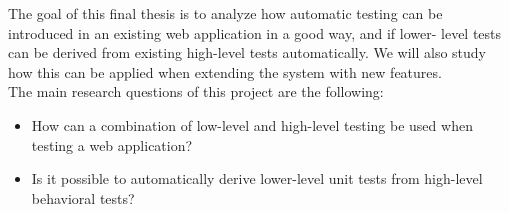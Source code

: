 
The goal of this final thesis is to analyze how automatic testing can be
introduced in an existing web application in a good way, and if lower-
level tests can be derived from existing high-level tests automatically.
We will also study how this can be applied when extending the system
with new features.\\

The main research questions of this project are the following:

\begin{itemize}
    \item How can a combination of low-level and high-level testing be
          used when testing a web application?
    \item Is it possible to automatically derive lower-level unit tests
          from high-level behavioral tests?
\end{itemize}
